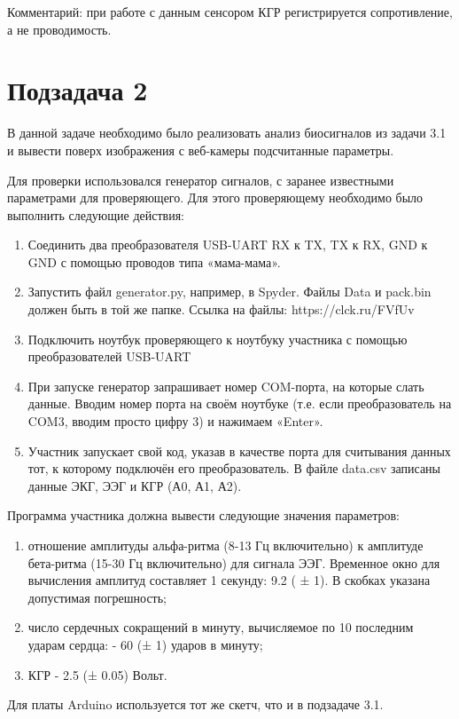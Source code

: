 Комментарий: при работе с данным сенсором КГР регистрируется сопротивление, а не проводимость.

\section*{Подзадача 2}

В данной задаче необходимо было реализовать анализ биосигналов из задачи 3.1 и вывести поверх изображения с веб-камеры подсчитанные параметры. 

Для проверки использовался генератор сигналов, с заранее известными параметрами для проверяющего. Для этого проверяющему необходимо было выполнить следующие действия:

\begin{enumerate}
\item Соединить два преобразователя USB-UART RX к TX, TX к RX, GND к GND с помощью проводов типа «мама-мама».
\item Запустить файл generator.py, например, в Spyder. Файлы Data и pack.bin должен быть в той же папке. Ссылка на файлы: https://clck.ru/FVfUv 
\item Подключить ноутбук проверяющего к ноутбуку участника с помощью преобразователей USB-UART
\item При запуске генератор запрашивает номер COM-порта, на которые слать данные. Вводим номер порта на своём ноутбуке (т.е. если преобразователь на COM3, вводим просто цифру 3) и нажимаем «Enter». 
\item Участник запускает свой код, указав в качестве порта для считывания данных тот, к которому подключён его преобразователь. В файле data.csv записаны данные ЭКГ, ЭЭГ и КГР (А0, А1, А2). 
\end{enumerate}

Программа участника должна вывести следующие значения параметров:
\begin{enumerate}
    \item отношение амплитуды альфа-ритма (8-13 Гц включительно) к амплитуде бета-ритма (15-30 Гц включительно) для сигнала ЭЭГ. Временное окно для вычисления амплитуд составляет 1 секунду: 9.2 ( ± 1). В скобках указана допустимая погрешность; 
    \item число сердечных сокращений в минуту, вычисляемое по 10 последним ударам сердца: - 60 (± 1) ударов в минуту;
    \item КГР - 2.5 (± 0.05) Вольт.
\end{enumerate}

Для платы Arduino используется тот же скетч, что и в подзадаче 3.1.

